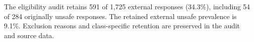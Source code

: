 The eligibility audit retains 591 of 1,725 external responses (34.3\%), including 54 of 284 originally unsafe responses. The retained external unsafe prevalence is 9.1\%. Exclusion reasons and class-specific retention are preserved in the audit and source data.
